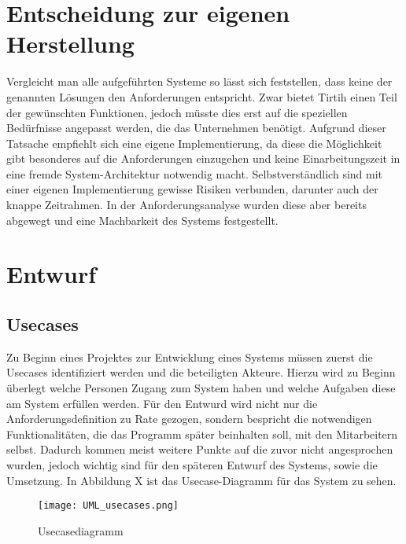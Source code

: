 \section{Entscheidung zur eigenen Herstellung}
\label{sec:decisionowncreating}

Vergleicht man alle aufgeführten Systeme so lässt sich feststellen, dass keine der genannten Lösungen den Anforderungen entspricht.
Zwar bietet Tirtih einen Teil der gewünschten Funktionen, jedoch müsste dies erst auf die speziellen Bedürfnisse angepasst werden, die das Unternehmen benötigt.
Aufgrund dieser Tatsache empfiehlt sich eine eigene Implementierung, da diese die Möglichkeit gibt besonderes auf die Anforderungen einzugehen und keine Einarbeitungszeit in eine fremde System-Architektur notwendig macht.
Selbstverständlich sind mit einer eigenen Implementierung gewisse Risiken verbunden, darunter auch der knappe Zeitrahmen.
In der Anforderungsanalyse wurden diese aber bereits abgewegt und eine Machbarkeit des Systems festgestellt.

\section{Entwurf}
\label{sec:Entwurf}


\subsection{Usecases}
\label{subsec:usecases}

Zu Beginn eines Projektes zur Entwicklung eines Systems müssen zuerst die Usecases identifiziert werden und die beteiligten Akteure.
Hierzu wird zu Beginn überlegt welche Personen Zugang zum System haben und welche Aufgaben diese am System erfüllen werden.
Für den Entwurd wird nicht nur die Anforderungsdefinition zu Rate gezogen, sondern bespricht die notwendigen Funktionalitäten, die das Programm später beinhalten soll, mit den Mitarbeitern selbst.
Dadurch kommen meist weitere Punkte auf die zuvor nicht angesprochen wurden, jedoch wichtig sind für den späteren Entwurf des Systems, sowie die Umsetzung.
In Abbildung X ist das Usecase-Diagramm für das System zu sehen.

\begin{figure}[H]
\centering
\texttt{[image: UML\_usecases.png]}
\caption{Usecasediagramm}
\label{fig:usecase001}
\end{figure}

